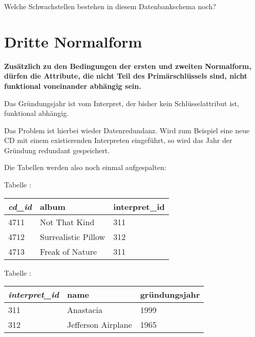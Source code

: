 Welche Schwachstellen bestehen in diesem Datenbankschema noch?


\section{Dritte Normalform}

\textbf{Zusätzlich zu den Bedingungen der ersten und zweiten Normalform, dürfen
die Attribute, die nicht Teil des Primärschlüssels sind, nicht funktional
voneinander abhängig sein.}

Das Gründungsjahr ist vom Interpret, der bisher kein Schlüsselattribut ist,
funktional abhängig.

Das Problem ist hierbei wieder Datenredundanz. Wird zum Beispiel eine neue CD
mit einem existierenden Interpreten eingeführt, so wird das Jahr der Gründung
redundant gespeichert.

Die Tabellen werden also noch einmal aufgespalten:

\begin{minipage}{0.48\textwidth}
Tabelle :

\vspace{2mm}

\hspace{0mm}
\begin{tabular}{|l|l|l|}\hline
\textbf{\em cd\_id} & \textbf{album} & \textbf{interpret\_id}\\ \hline 
4711 & Not That Kind       & 311\\ \hline
4712 & Surrealistic Pillow & 312\\ \hline
4713 & Freak of Nature     & 311\\ \hline
\end{tabular}
\end{minipage}
\begin{minipage}{0.52\textwidth}
Tabelle :

\vspace{2mm}

\begin{tabular}{|l|l|l|}\hline
\textbf{\em interpret\_id} & \textbf{name} & \textbf{gründungsjahr}\\ \hline
311 & Anastacia          & 1999\\ \hline
312 & Jefferson Airplane & 1965\\ \hline
\end{tabular}
\end{minipage}

\vspace{4mm}

